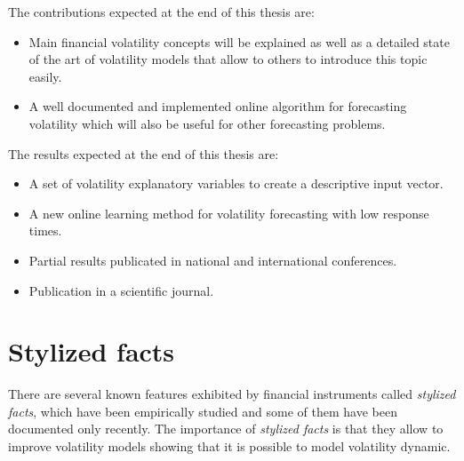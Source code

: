 The contributions expected at the end of this thesis are:
\begin{itemize}
   \item Main financial volatility concepts will be explained as well
   as a detailed state of the art of volatility models that allow to
   others to introduce this topic easily.
   \item A well documented and implemented online algorithm for forecasting
   volatility which will also be useful for other forecasting
   problems.
\end{itemize}
The results expected at the end of this thesis are:
\begin{itemize}
  \item A set of volatility explanatory variables to create a descriptive input vector.
   \item A new online learning method for volatility forecasting with low response times.
    \item Partial results publicated in national and international conferences.
    \item Publication in a scientific journal.
\end{itemize}


\newpage
\section{Stylized facts}
\label{sec:stylizedfacts}

There are several known features exhibited by financial instruments called \textit{stylized facts}, which have been empirically studied and some of them have been documented only recently. The importance of \textit{stylized facts} is that they allow to improve volatility models showing that it is possible to model volatility dynamic.

